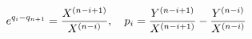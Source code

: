 \begin{equation}
e^{q_i-q_{n+1}} ={X^{(n-i+1)}\over X^{(n-i)}},\quad p_i = {Y^{(n-i+1)}\over X^{(n-i+1)}}-{Y^{(n-i)}\over X^{(n-i)}}
\label{reconclass}
\end{equation}

